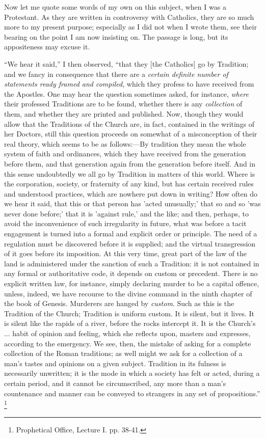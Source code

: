 Now let me quote some words of my own on this subject,
when I was a Protestant. As they are written in
controversy with Catholics, they are so much more to my
present purpose; especially as I did not when I wrote
them, see their bearing on the point I am now insisting
on. The passage is long, but its appositeness may excuse
it.

``We hear it said,'' I then observed,
``that they [the Catholics] go by Tradition; and we
fancy in consequence that there are a \emph{certain
definite number of statements ready framed and compiled},
which they profess to have received from the Apostles.
One may hear the question sometimes asked, for instance, \emph{where}
their professed Traditions are to be found, whether there
is any \emph{collection} of them, and whether they are
printed and published. Now, though they would allow that
the Traditions of the Church are, in fact, contained in
the writings of her Doctors, still this question proceeds
on somewhat of a misconception of their real theory,
which seems to be as follows:—By tradition they mean the
whole system of faith and ordinances, which they have
received from the generation before them, and that
generation again from the generation before itself. And
in this sense undoubtedly we all go by Tradition in
matters of this world. Where is the corporation, society,
or fraternity of any kind, but has certain received rules
and understood practices, which are nowhere put down in
writing? How often do we hear it said, that this or that
person has 'acted unusually;' that so and so 'was never
done before;' that it is 'against rule,' and the like;
and then, perhaps, to avoid the inconvenience of such
irregularity in future, what was before a tacit
engagement is turned into a formal and explicit order or
principle. The need of a regulation must be discovered
before it is supplied; and the virtual transgression of
it goes before its imposition. At this very time, great
part of the law of the land is administered under the
sanction of such a Tradition: it is not contained in any
formal or authoritative code, it depends on custom or
precedent. There is no explicit written law, for
instance, simply declaring murder to be a capital
offence, unless, indeed, we have recourse to the divine
command in the ninth chapter of the book of Genesis.
Murderers are hanged by \emph{custom}. Such as this is
the Tradition of the Church; Tradition is uniform custom.
It is silent, but it lives. It is silent like the rapids
of a river, before the rocks intercept it. It is the
Church's ... habit of opinion and feeling, which she
reflects upon, masters and expresses, according to the
emergency. We see, then, the mistake of asking for a
complete collection of the Roman traditions; as well
might we ask for a collection of a man's tastes and
opinions on a given subject. Tradition in its fulness is
necessarily unwritten; it is the mode in which a society
has felt or acted, during a certain period, and it cannot
be circumscribed, any more than a man's countenance and
manner can be conveyed to strangers in any set of
propositions.'' \footnote{Prophetical Office, Lecture I.
pp. 38-41.}

